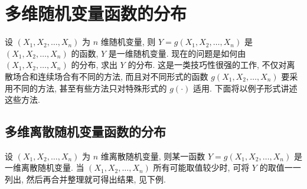       \section{多维随机变量函数的分布}\label{sec:3.3}
   设 $(X_1,X_2,\ldots,X_n)$ 为 $n$ 维随机变量, 则 $Y=g(X_1,X_2,\ldots,X_n)$ 是 $(X_1,X_2,\ldots,X_n)$ 的函数, $Y$ 是一维随机变量. 现在的问题是如何由 $(X_1,X_2,\ldots,X_n)$ 的分布, 求出 $Y$ 的分布. 这是一类技巧性很强的工作, 不仅对离散场合和连续场合有不同的方法, 而且对不同形式的函数 $g(X_1,X_2,\ldots,X_n)$ 要采用不同的方法, 甚至有些方法只对特殊形式的 $g(\cdot)$ 适用. 下面将以例子形式讲述这些方法.
   \subsection{多维离散随机变量函数的分布}\label{ssec:3.3.1}
   设 $(X_1,X_2,\ldots,X_n)$ 为 $n$ 维离散随机变量, 则某一函数 $Y=g(X_1,X_2,\ldots,X_n)$ 是一维离散随机变量. 当 $(X_1,X_2,\ldots,X_n)$ 所有可能取值较少时, 可将 $Y$ 的取值一一列出, 然后再合并整理就可得出结果, 见下例.

